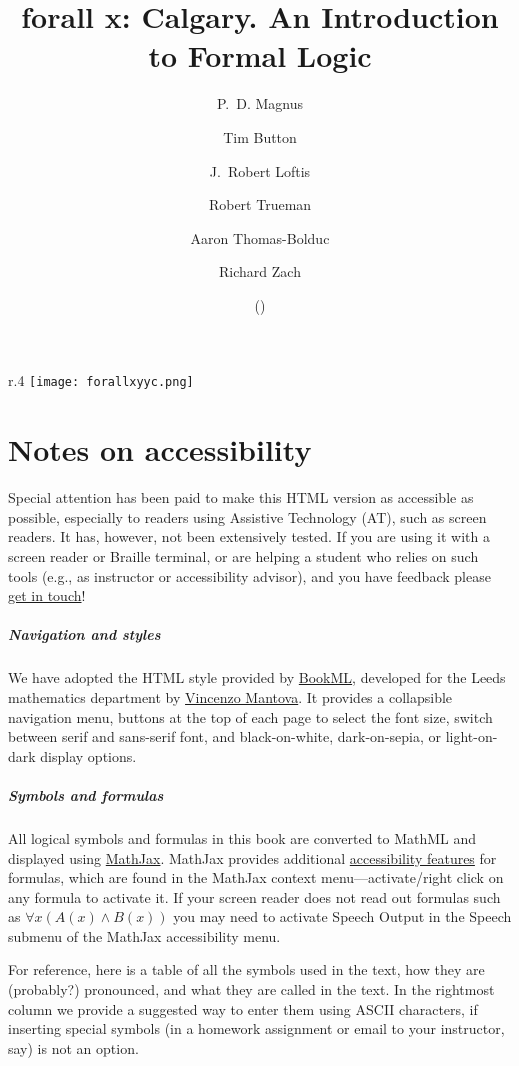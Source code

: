 \documentclass{book}
\title{forall x: Calgary. An Introduction to Formal Logic}
\author{P.~D. Magnus\and
Tim Button\and
J.~Robert Loftis\and
Robert Trueman\and
Aaron Thomas-Bolduc\and
Richard Zach}
\date{\forallxversion{} (\gitAuthorDate)}
\begin{document}
\begin{wrapfigure}{r}{.4\textwidth}
\texttt{[image: forallxyyc.png]}
\end{wrapfigure}



\chapter{Notes on accessibility}

Special attention has been paid to make this HTML version as
accessible as possible, especially to readers using Assistive
Technology (AT), such as screen readers. It has, however, not
been extensively tested. If you are using it with a screen reader or
Braille terminal, or are helping a student who relies on such tools
(e.g., as instructor or accessibility advisor), and you have feedback
please \href{mailto:rzach@ucalgary.ca}{get in touch}!

\paragraph{Navigation and styles} We have adopted the HTML style
provided by \href{https://vlmantova.github.io/bookml/}{BookML},
developed for the Leeds mathematics department by
\href{https://eps.leeds.ac.uk/maths/staff/4058/dr-vincenzo-l-mantova}{Vincenzo
Mantova}. It provides a collapsible navigation menu, buttons at the
top of each page to select the font size, switch between serif and
sans-serif font, and black-on-white, dark-on-sepia, or light-on-dark
display options.

\paragraph{Symbols and formulas} All logical symbols and formulas in
this book are converted to MathML and displayed using
\href{https://www.mathjax.org/}{MathJax}. MathJax provides additional
\href{https://docs.mathjax.org/en/latest/basic/accessibility.html}{accessibility
features} for formulas, which are found in the MathJax context
menu---activate/right click on any formula to activate it. If your
screen reader does not read out formulas such as $\forall x(A(x) \land
B(x))$ you may need to activate Speech Output in the Speech submenu of
the MathJax accessibility menu.

For reference, here is a table of all the symbols used in the text,
how they are (probably?) pronounced, and what they are called in the
text. In the rightmost column we provide a suggested way to enter them
using ASCII characters, if inserting special symbols (in a homework
assignment or email to your instructor, say) is not an option.
\end{document}
